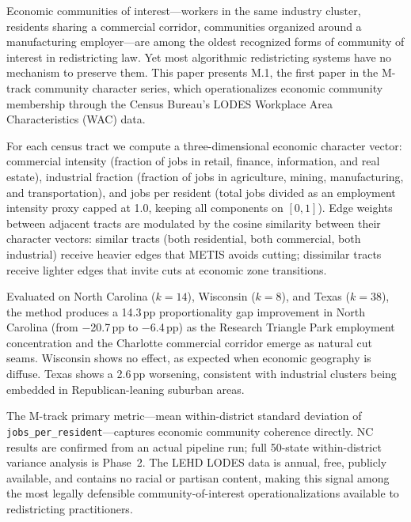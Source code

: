 Economic communities of interest---workers in the same industry cluster,
residents sharing a commercial corridor, communities organized around a
manufacturing employer---are among the oldest recognized forms of community
of interest in redistricting law.
Yet most algorithmic redistricting systems have no mechanism to preserve them.
This paper presents M.1, the first paper in the M-track community character
series, which operationalizes economic community membership through the
Census Bureau's LODES Workplace Area Characteristics (WAC) data.

For each census tract we compute a three-dimensional economic character vector:
commercial intensity (fraction of jobs in retail, finance, information, and
real estate), industrial fraction (fraction of jobs in agriculture, mining,
manufacturing, and transportation), and jobs per resident (total jobs divided
as an employment intensity proxy capped at 1.0, keeping all components on $[0,1]$).
Edge weights between adjacent tracts are modulated by the cosine similarity
between their character vectors: similar tracts (both residential, both
commercial, both industrial) receive heavier edges that METIS avoids cutting;
dissimilar tracts receive lighter edges that invite cuts at economic zone
transitions.

Evaluated on North Carolina ($k=14$), Wisconsin ($k=8$), and Texas ($k=38$),
the method produces a 14.3\,pp proportionality gap improvement in North
Carolina (from $-$20.7\,pp to $-$6.4\,pp) as the Research Triangle Park
employment concentration and the Charlotte commercial corridor emerge as
natural cut seams.
Wisconsin shows no effect, as expected when economic geography is diffuse.
Texas shows a 2.6\,pp worsening, consistent with industrial clusters being
embedded in Republican-leaning suburban areas.

The M-track primary metric---mean within-district standard deviation of
\texttt{jobs\_per\_resident}---captures economic community coherence directly.
NC results are confirmed from an actual pipeline run; full 50-state
within-district variance analysis is Phase~2.
The LEHD LODES data is annual, free, publicly available, and contains no
racial or partisan content, making this signal among the most legally
defensible community-of-interest operationalizations available to
redistricting practitioners.
